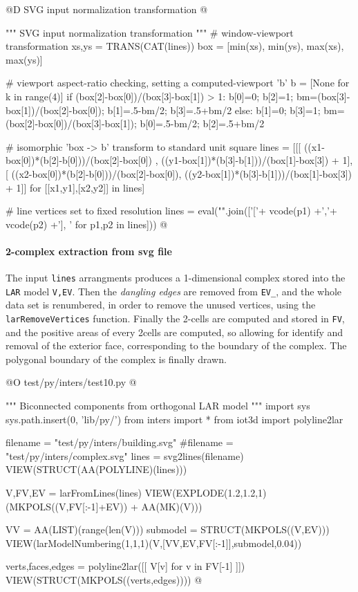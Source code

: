 \documentclass[11pt,oneside]{article}    %
\begin{document}
@D SVG input normalization transformation
@{""" SVG input normalization transformation """
# window-viewport transformation
xs,ys = TRANS(CAT(lines))
box = [min(xs), min(ys), max(xs), max(ys)]

# viewport aspect-ratio checking, setting a computed-viewport 'b'
b = [None for k in range(4)]
if (box[2]-box[0])/(box[3]-box[1]) > 1:  
    b[0]=0; b[2]=1; bm=(box[3]-box[1])/(box[2]-box[0]); b[1]=.5-bm/2; b[3]=.5+bm/2
else: 
    b[1]=0; b[3]=1; bm=(box[2]-box[0])/(box[3]-box[1]); b[0]=.5-bm/2; b[2]=.5+bm/2

# isomorphic 'box -> b' transform to standard unit square
lines = [[[ 
((x1-box[0])*(b[2]-b[0]))/(box[2]-box[0]) , 
((y1-box[1])*(b[3]-b[1]))/(box[1]-box[3]) + 1], [
((x2-box[0])*(b[2]-b[0]))/(box[2]-box[0]), 
((y2-box[1])*(b[3]-b[1]))/(box[1]-box[3]) + 1]]  
      for [[x1,y1],[x2,y2]] in lines]

# line vertices set to fixed resolution
lines = eval("".join(['['+ vcode(p1) +','+ vcode(p2) +'], ' for p1,p2 in lines]))
@}


\paragraph{2-complex extraction from svg file}
The input \texttt{lines} arrangments produces a 1-dimensional complex stored into the \texttt{LAR} model \texttt{V,EV}. Then the \emph{dangling edges} are removed from \texttt{EV\_},
and the whole data set is renumbered, in order to remove the unused vertices, using the \texttt{larRemoveVertices} function.
Finally the 2-cells are computed and stored in \texttt{FV}, and the positive areas of every 2cells are computed, so allowing for identify and removal of the exterior face, 
corresponding to the boundary of the complex.
The polygonal boundary of the complex is finally drawn.

@O test/py/inters/test10.py
@{""" Biconnected components from orthogonal LAR model """
import sys
sys.path.insert(0, 'lib/py/')
from inters import *
from iot3d import polyline2lar

filename = "test/py/inters/building.svg"
#filename = "test/py/inters/complex.svg"
lines = svg2lines(filename)
VIEW(STRUCT(AA(POLYLINE)(lines)))
    
V,FV,EV = larFromLines(lines)
VIEW(EXPLODE(1.2,1.2,1)(MKPOLS((V,FV[:-1]+EV)) + AA(MK)(V)))

VV = AA(LIST)(range(len(V)))
submodel = STRUCT(MKPOLS((V,EV)))
VIEW(larModelNumbering(1,1,1)(V,[VV,EV,FV[:-1]],submodel,0.04))

verts,faces,edges = polyline2lar([[ V[v] for v in FV[-1] ]])
VIEW(STRUCT(MKPOLS((verts,edges))))
@}
\end{document}

